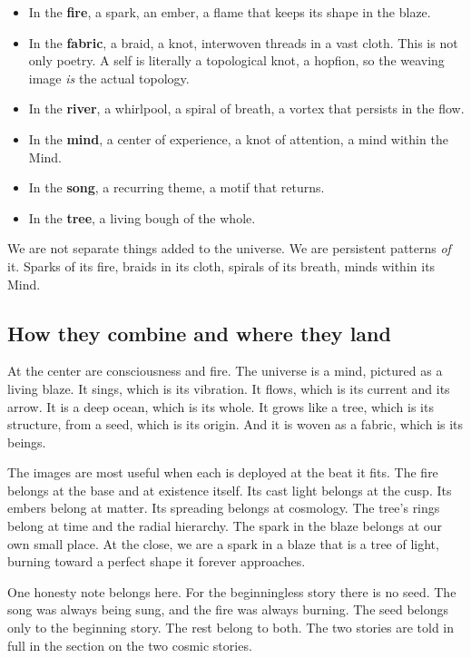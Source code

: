 \begin{itemize}
\item In the \textbf{fire}, a spark, an ember, a flame that keeps its shape in the blaze.
\item In the \textbf{fabric}, a braid, a knot, interwoven threads in a vast cloth. This is not only poetry. A self is literally a topological knot, a hopfion, so the weaving image \emph{is} the actual topology.
\item In the \textbf{river}, a whirlpool, a spiral of breath, a vortex that persists in the flow.
\item In the \textbf{mind}, a center of experience, a knot of attention, a mind within the Mind.
\item In the \textbf{song}, a recurring theme, a motif that returns.
\item In the \textbf{tree}, a living bough of the whole.
\end{itemize}

We are not separate things added to the universe. We are persistent patterns \emph{of} it. Sparks of its fire, braids in its cloth, spirals of its breath, minds within its Mind.

\subsection{How they combine and where they land}

At the center are consciousness and fire. The universe is a mind, pictured as a living blaze. It sings, which is its vibration. It flows, which is its current and its arrow. It is a deep ocean, which is its whole. It grows like a tree, which is its structure, from a seed, which is its origin. And it is woven as a fabric, which is its beings.

The images are most useful when each is deployed at the beat it fits. The fire belongs at the base and at existence itself. Its cast light belongs at the cusp. Its embers belong at matter. Its spreading belongs at cosmology. The tree's rings belong at time and the radial hierarchy. The spark in the blaze belongs at our own small place. At the close, we are a spark in a blaze that is a tree of light, burning toward a perfect shape it forever approaches.

One honesty note belongs here. For the beginningless story there is no seed. The song was always being sung, and the fire was always burning. The seed belongs only to the beginning story. The rest belong to both. The two stories are told in full in the section on the two cosmic stories.

